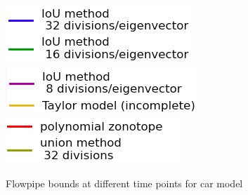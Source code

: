 \begin{figure}
\includegraphics[scale = 0.41]{autocarImages/leg1.png}~
  \includegraphics[scale = 0.41]{autocarImages/leg2.png}~
  \includegraphics[scale = 0.41]{autocarImages/leg3.png}
  \caption{Flowpipe bounds at different time points for
    car model}\label{fig:flowcar}
\end{figure}
%
